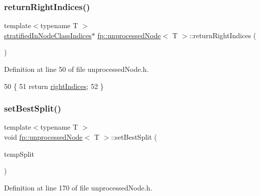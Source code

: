 \subsubsection{\texorpdfstring{return\+Right\+Indices()}{returnRightIndices()}}
{\footnotesize\ttfamily template$<$typename T $>$ \\
\hyperlink{classfp_1_1stratifiedInNodeClassIndices}{stratified\+In\+Node\+Class\+Indices}$\ast$ \hyperlink{classfp_1_1unprocessedNode}{fp\+::unprocessed\+Node}$<$ T $>$\+::return\+Right\+Indices (\begin{DoxyParamCaption}{ }\end{DoxyParamCaption})\hspace{0.3cm}{\ttfamily [inline]}}



Definition at line 50 of file unprocessed\+Node.\+h.


\begin{DoxyCode}
50                                                                          \{
51                     \textcolor{keywordflow}{return} \hyperlink{classfp_1_1unprocessedNode_a4e805660b305b1056cea187ed5584a1d}{rightIndices};
52                 \}
\end{DoxyCode}
\mbox{\label{classfp_1_1unprocessedNode_ae7ad0b6bf8142ea5d3d851e29b5b9aee}} 
\subsubsection{\texorpdfstring{set\+Best\+Split()}{setBestSplit()}}
{\footnotesize\ttfamily template$<$typename T $>$ \\
void \hyperlink{classfp_1_1unprocessedNode}{fp\+::unprocessed\+Node}$<$ T $>$\+::set\+Best\+Split (\begin{DoxyParamCaption}\item[{\hyperlink{classfp_1_1splitInfo}{split\+Info}$<$ T $>$}]{temp\+Split }\end{DoxyParamCaption})\hspace{0.3cm}{\ttfamily [inline]}}



Definition at line 170 of file unprocessed\+Node.\+h.


